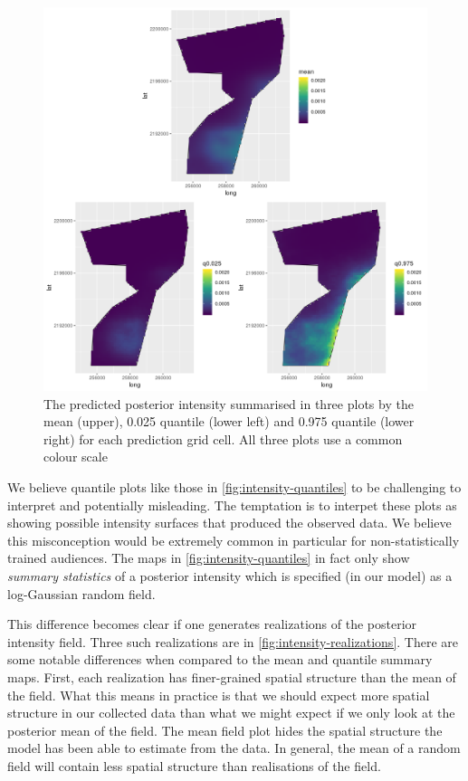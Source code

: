 \documentclass[preprint,12pt]{elsarticle}
\begin{document}
\begin{figure}
	\includegraphics[scale=0.5]{figures/intensity_quantiles.png}
	\caption{The predicted posterior intensity summarised in three plots by the mean (upper),  0.025 quantile (lower left) and 0.975 quantile (lower right) for each prediction grid cell.  All three plots use a common colour scale}
	\label{fig:intensity-quantiles}
\end{figure}

We believe quantile plots like those in \autoref{fig:intensity-quantiles} to be challenging to interpret and potentially misleading.  The temptation is to interpet these plots as showing possible intensity surfaces that produced the observed data.  We believe this misconception would be extremely common in particular for non-statistically trained audiences. The maps in \autoref{fig:intensity-quantiles} in fact only show \textit{summary statistics} of a posterior intensity which is specified (in our model) as a log-Gaussian random field.

This difference becomes clear if one generates realizations of the posterior intensity field.  Three such realizations are in \autoref{fig:intensity-realizations}.  There are some notable differences when compared to the mean and quantile summary maps.  First, each realization has finer-grained spatial structure than the mean of the field.  What this means in practice is that we should expect more spatial structure in our collected data than what we might expect if we only look at the posterior mean of the field.  The mean field plot hides the spatial structure the model has been able to estimate from the data.  In general, the mean of a random field will contain less spatial structure than realisations of the field.
\end{document}
